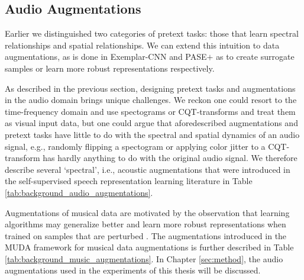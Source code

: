 \subsection{Audio Augmentations}\label{sec:audio_transformations}
Earlier we distinguished two categories of pretext tasks: those that learn spectral relationships and spatial relationships.
We can extend this intuition to data augmentations, as is done in Exemplar-CNN \cite{dosovitskiy_discriminative_2014} and PASE$+$ \cite{Ravanelli2020} as to create surrogate samples or learn more robust representations respectively.

As described in the previous section, designing pretext tasks and augmentations in the audio domain brings unique challenges.
We reckon one could resort to the time-frequency domain and use spectograms or CQT-transforms and treat them as visual input data, but one could argue that aforedescribed augmentations and pretext tasks have little to do with the spectral and spatial dynamics of an audio signal, e.g., randomly flipping a spectogram or applying color jitter to a CQT-transform has hardly anything to do with the original audio signal.
We therefore describe several `spectral', i.e., acoustic augmentations that were introduced in the self-supervised speech representation learning literature \cite{Ravanelli2020} in Table \ref{tab:background_audio_augmentations}.

Augmentations of musical data are motivated by the observation that learning algorithms may generalize better and learn more robust representations when trained on samples that are perturbed \cite{Sturm2015}.
The augmentations introduced in the MUDA framework for musical data augmentations is further described in Table \ref{tab:background_music_augmentations}.
In Chapter \ref{sec:method}, the audio augmentations used in the experiments of this thesis will be discussed.

